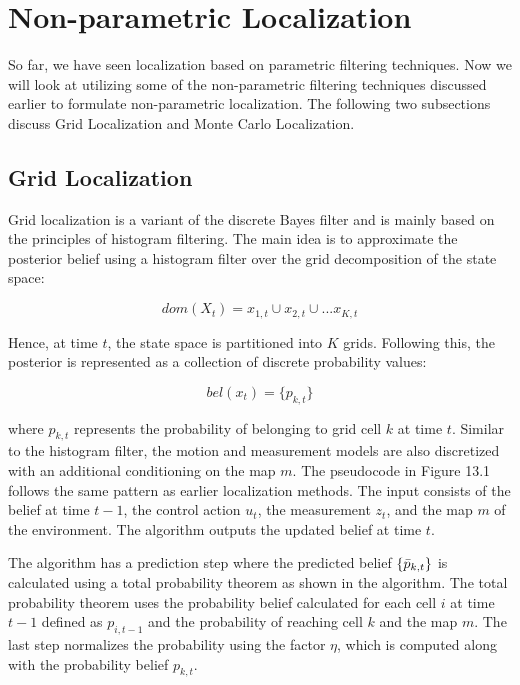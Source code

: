 \section{Non-parametric Localization}
So far, we have seen localization based on parametric filtering techniques. Now we will look at utilizing
some of the non-parametric filtering techniques discussed earlier to formulate non-parametric localization.
The following two subsections discuss Grid Localization and Monte Carlo Localization.

\subsection{Grid Localization}
Grid localization is a variant of the discrete Bayes filter and is mainly based on the principles of histogram filtering. The main idea is to approximate the posterior belief using a histogram filter over the grid decomposition of the state space:

$$ dom(X_t) = x_{1,t}\cup x_{2,t}\cup...x_{K,t} $$

Hence, at time $t$, the state space is partitioned into $K$ grids. Following this, the posterior is represented as a collection of discrete probability values:

$$ bel(x_t) = \{p_{k,t}\}$$

where $p_{k,t}$ represents the probability of belonging to grid cell $k$ at time $t$. Similar to the histogram filter, the motion and measurement models are also discretized with an additional conditioning on the map $m$. The pseudocode in Figure 13.1 follows the same pattern as earlier localization methods. The input consists of the belief at time $t-1$, the control action $u_t$, the measurement $z_t$, and the map $m$ of the environment. The algorithm outputs the updated belief at time $t$.

The algorithm has a prediction step where the predicted belief $\{\Bar{p}_{k,t}\}$ is calculated using a total probability theorem as shown in the algorithm. The total probability theorem uses the probability belief calculated for each cell $i$ at time $t-1$ defined as $p_{i,t-1}$ and the probability of reaching cell $k$ and the map $m$. The last step normalizes the probability using the factor $\eta$, which is computed along with the probability belief $p_{k,t}$.

